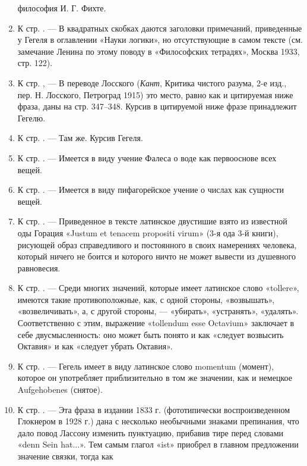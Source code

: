 \begin{enumerate}
философия И. Г. Фихте.
\item \label{bkm:Ref474656777}К стр. \pageref{bkm:bm18}. — В квадратных
скобках даются заголовки примечаний, приведенные у Гегеля в оглавлении
«Науки логики», но отсутствующие в самом тексте (см. замечание Ленина по
этому поводу в «Философских тетрадях», Москва 1933, стр. 122).
\item \label{bkm:Ref474656876}К стр. \pageref{bkm:bm19}, — В переводе
Лосского ({\em Кант}, Критика чистого разума, 2-е изд., пер. Н.
Лосского, Петроград 1915) это место, равно как и цитируемая ниже фраза,
даны на стр. 347–348. Курсив в цитируемой ниже фразе принадлежит Гегелю.
\item \label{bkm:Ref474656885}К стр. \pageref{bkm:bm20}. — Там же. Курсив
Гегеля.
\item \label{bkm:Ref474665318}К стр. \pageref{bkm:bm21}. — Имеется в виду
учение Фалеса о воде как первооснове всех вещей.
\item \label{bkm:Ref474665328}К стр. \pageref{bkm:bm22}. — Имеется в виду
пифагорейское учение о числах как сущности вещей.
\item \label{bkm:Ref474665342}К стр. \pageref{bkm:bm23}. — Приведенное в
тексте латинское двустишие взято из известной оды Горация «Justum et
tenacem propositi virum» (3-я ода 3-й книги), рисующей образ справедливого
и постоянного в своих намерениях человека, который ничего не боится и
которого ничто не может вывести из душевного равновесия.
\item \label{bkm:Ref474665370}К стр. \pageref{bkm:bm24}. — Среди многих
значений, которые имеет латинское слово «tollere», имеются такие
противоположные, как, с одной стороны, «возвышать», «возвеличивать», а, с
другой стороны, — «убирать», «устранять», «удалять». Соответственно с этим,
выражение «tollendum esse Octavium» заключает в себе двусмысленность: оно
может быть понято и как «следует возвысить Октавия» и как «следует убрать
Октавия».
\item \label{bkm:Ref474665385}К стр. \pageref{bkm:bm25}. — Гегель имеет в
виду латинское слово momentum (момент), которое он употребляет
приблизительно в том же значении, как и немецкое Aufgehobenes (снятое).
\item \label{bkm:Ref474665400}К стр. \pageref{bkm:bm26}. — Эта фраза в
издании 1833 г. (фототипически воспроизведенном Глокнером в 1928 г.) дана с
несколько необычными знаками препинания, что дало повод Лассону изменить
пунктуацию, прибавив тире перед словами «denn Sein hat...». Тем самым
глагол «ist» приобрел в главном предложении значение связки, тогда как

\end{enumerate}

